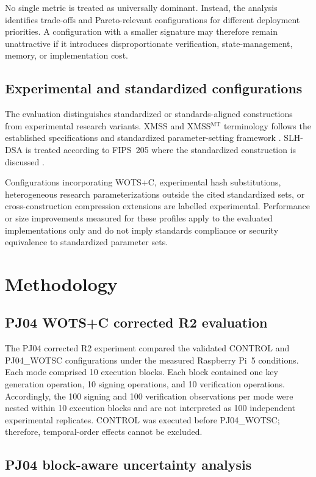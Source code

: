 \documentclass[pdflatex,sn-mathphys-num]{sn-jnl}
\begin{document}
No single metric is treated as universally dominant. Instead, the
analysis identifies trade-offs and Pareto-relevant configurations for
different deployment priorities. A configuration with a smaller
signature may therefore remain unattractive if it introduces
disproportionate verification, state-management, memory, or
implementation cost.

\subsection{Experimental and standardized configurations}
The evaluation distinguishes standardized or standards-aligned
constructions from experimental research variants. XMSS and
XMSS$^{\mathrm{MT}}$ terminology follows the established
specifications and standardized parameter-setting framework
\cite{RFC8391,NIST800208}. SLH-DSA is treated according to FIPS~205
where the standardized construction is discussed
\cite{NIST2024FIPS205}.

Configurations incorporating WOTS+C, experimental hash substitutions,
heterogeneous research parameterizations outside the cited
standardized sets, or cross-construction compression extensions are
labelled experimental. Performance or size improvements measured for
these profiles apply to the evaluated implementations only and do not
imply standards compliance or security equivalence to standardized
parameter sets.

\section{Methodology}

\subsection{PJ04 WOTS+C corrected R2 evaluation}

The PJ04 corrected R2 experiment compared the validated CONTROL and
PJ04\_WOTSC configurations under the measured Raspberry Pi~5 conditions.
Each mode comprised 10 execution blocks. Each block contained one key
generation operation, 10 signing operations, and 10 verification operations.
Accordingly, the 100 signing and 100 verification observations per mode were
nested within 10 execution blocks and are not interpreted as 100 independent
experimental replicates. CONTROL was executed before PJ04\_WOTSC; therefore,
temporal-order effects cannot be excluded.

\subsection{PJ04 block-aware uncertainty analysis}
\end{document}
